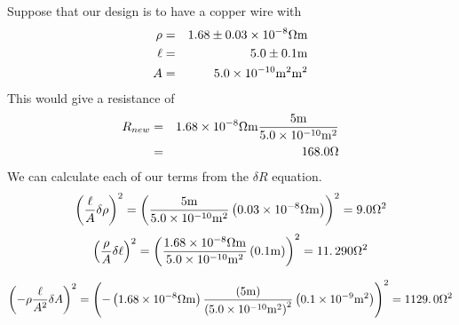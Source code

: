 Suppose that our design is to have a copper wire with 
\begin{eqnarray*}
\rho &=&1.68\pm 0.03\times 10^{-8}\unit{%
\Omega%
}\unit{m} \\
\ell &=&5.0\pm 0.1\unit{m} \\
A &=&5.0\times 10^{-10}\unit{m}^{2}\unit{m}^{2}
\end{eqnarray*}%
This would give a resistance of 
\begin{eqnarray*}
R_{new} &=&1.68\times 10^{-8}\unit{%
\Omega%
}\unit{m}\frac{5\unit{m}}{5.0\times 10^{-10}\unit{m}^{2}} \\
&=&168.0\unit{%
\Omega%
}
\end{eqnarray*}%
We can calculate each of our terms from the $\delta R$ equation. 
\begin{equation*}
\left( \frac{\ell }{A}\delta \rho \right) ^{2}=\left( \frac{5\unit{m}}{%
5.0\times 10^{-10}\unit{m}^{2}}\left( 0.03\times 10^{-8}\unit{%
\Omega%
}\unit{m}\right) \right) ^{2}=9.0\unit{%
\Omega%
}^{2}
\end{equation*}%
\begin{equation*}
\left( \frac{\rho }{A}\delta \ell \right) ^{2}=\left( \frac{1.68\times
10^{-8}\unit{%
\Omega%
}\unit{m}}{5.0\times 10^{-10}\unit{m}^{2}}\left( 0.1\unit{m}\right) \right)
^{2}=11.\,\allowbreak 290\unit{%
\Omega%
}^{2}
\end{equation*}

\begin{equation*}
\left( -\rho \frac{\ell }{A^{2}}\delta A\right) ^{2}=\left( -\left(
1.68\times 10^{-8}\unit{%
\Omega%
}\unit{m}\right) \frac{\left( 5\unit{m}\right) }{\left( 5.0\times 10^{-10}%
\unit{m}^{2}\right) ^{2}}\left( 0.1\times 10^{-9}\unit{m}^{2}\right) \right)
^{2}=1129.\,\allowbreak 0\unit{%
\Omega%
}^{2}
\end{equation*}

